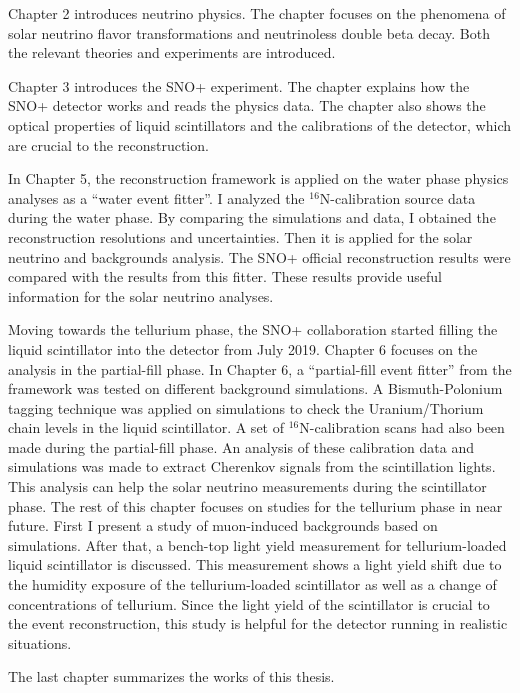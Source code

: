 Chapter 2 introduces neutrino physics. The chapter focuses on the phenomena of solar neutrino flavor transformations and neutrinoless double beta decay. Both the relevant theories and experiments are introduced.

Chapter 3 introduces the SNO+ experiment. The chapter explains how the SNO+ detector works and reads the physics data. The chapter also shows the optical properties of liquid scintillators and the calibrations of the detector, which are crucial to the reconstruction.

In Chapter 5, the reconstruction framework is applied on the water phase physics analyses as a ``water event fitter''. I analyzed the $^{16}$N-calibration source data during the water phase. By comparing the simulations and data, I obtained the reconstruction resolutions and uncertainties. Then it is applied for the solar neutrino and backgrounds analysis. The SNO+ official reconstruction results were compared with the results from this fitter. These results provide useful information for the solar neutrino analyses.

Moving towards the tellurium phase, the SNO+ collaboration started filling the liquid scintillator into the detector from July 2019. Chapter 6 focuses on the analysis in the partial-fill phase. In Chapter 6, a ``partial-fill event fitter'' from the framework was tested on different background simulations. A Bismuth-Polonium tagging technique was applied on simulations to check the Uranium/Thorium chain levels in the liquid scintillator. A set of $^{16}$N-calibration scans had also been made during the partial-fill phase. An analysis of these calibration data and simulations was made to extract Cherenkov signals from the scintillation lights. This analysis can help the solar neutrino measurements during the scintillator phase.
The rest of this chapter focuses on studies for the tellurium phase in near future. First I present a study of muon-induced backgrounds based on simulations. After that, a bench-top light yield measurement for tellurium-loaded liquid scintillator is discussed. This measurement shows a light yield shift due to the humidity exposure of the tellurium-loaded scintillator as well as a change of concentrations of tellurium. Since the light yield of the scintillator is crucial to the event reconstruction, this study is helpful for the detector running in realistic situations.

The last chapter summarizes the works of this thesis.
